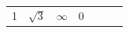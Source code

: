 {\begin{tabular}[t]{|l|l|l|l|l|l|l|}
        1 &
                  $\sqrt{3}$
                 &
                  $\infty $
                 &
        0%
     \tabularnewline\cline{1-1}\cline{2-2}\cline{3-3}\cline{4-4}\cline{5-5}\cline{6-6}\cline{7-7}
    \end{tabular}} %
        \addtolength{\mytableboxheight}{\mytableboxdepth}
